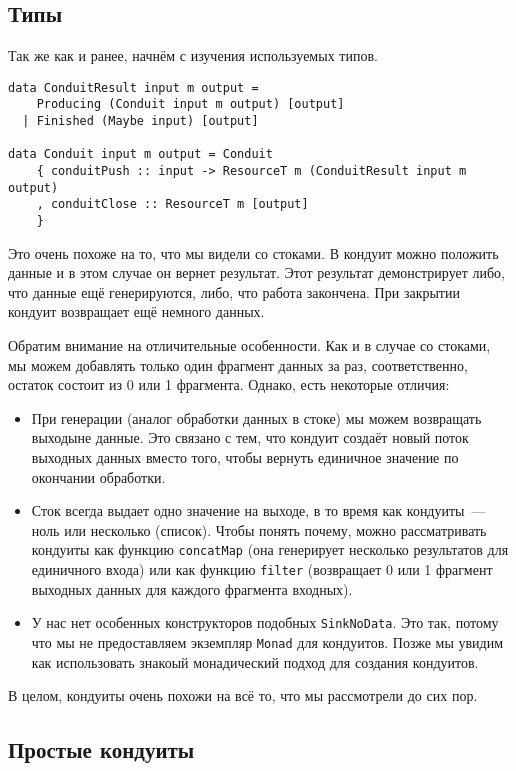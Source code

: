 {\subsection{Типы}
Так же как и ранее, начнём с изучения используемых типов.
\begin{lstlisting}
data ConduitResult input m output =
    Producing (Conduit input m output) [output]
  | Finished (Maybe input) [output]

data Conduit input m output = Conduit
    { conduitPush :: input -> ResourceT m (ConduitResult input m output)
    , conduitClose :: ResourceT m [output]
    }
\end{lstlisting}
Это очень похоже на то, что мы видели со стоками. В кондуит можно положить данные и в этом
случае он вернет результат. Этот результат демонстрирует либо, что данные ещё
генерируются, либо, что работа закончена. При закрытии кондуит возвращает ещё немного данных.

Обратим внимание на отличительные особенности. Как и в случае со стоками, мы можем
добавлять только один фрагмент данных за раз, соответственно, остаток состоит из 0 или 1 фрагмента.
Однако, есть некоторые отличия:

\begin{itemize}  
\item При генерации (аналог обработки данных в стоке) мы можем возвращать выходыне данные.
Это связано с тем, что кондуит создаёт новый поток выходных данных вместо того, чтобы вернуть единичное значение по окончании обработки.
\item Сток всегда выдает одно значение на выходе, в то время как кондуиты~--- ноль или 
несколько (список). Чтобы понять почему, можно рассматривать кондуиты как функцию
\lstinline'concatMap' (она генерирует несколько результатов для единичного входа)
или как функцию \lstinline'filter' (возвращает 0 или 1 фрагмент выходных данных для каждого фрагмента входных).
\item У нас нет особенных конструкторов подобных \lstinline'SinkNoData'. Это так, потому что мы не
предоставляем
экземпляр \lstinline'Monad' для кондуитов. Позже мы увидим как использовать знакоый 
монадический подход для создания кондуитов.
\end{itemize}  
В целом, кондуиты очень похожи на всё то, что мы рассмотрели до сих пор.

\subsection{Простые кондуиты}

}
